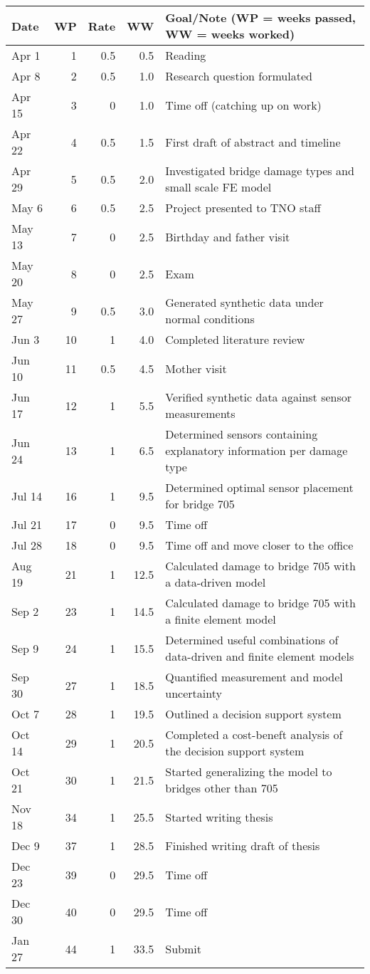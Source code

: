 \documentclass[11pt]{article}
\begin{document}
\begin{center}
\begin{tabular}{lrrrl}
Date & WP & Rate & WW & Goal/Note (WP = weeks passed, WW = weeks worked)\\
\hline
Apr 1 & 1 & 0.5 & 0.5 & Reading\\
Apr 8 & 2 & 0.5 & 1.0 & Research question formulated\\
Apr 15 & 3 & 0 & 1.0 & \cellcolor{blue!25} Time off (catching up on work)\\
Apr 22 & 4 & 0.5 & 1.5 & First draft of abstract and timeline\\
Apr 29 & 5 & 0.5 & 2.0 & Investigated bridge damage types and small scale FE model\\
May 6 & 6 & 0.5 & 2.5 & Project presented to TNO staff\\
May 13 & 7 & 0 & 2.5 & \cellcolor{blue!25} Birthday and father visit\\
May 20 & 8 & 0 & 2.5 & \cellcolor{blue!25} Exam\\
May 27 & 9 & 0.5 & 3.0 & Generated synthetic data under normal conditions\\
Jun 3 & 10 & 1 & 4.0 & Completed literature review\\
Jun 10 & 11 & 0.5 & 4.5 & \cellcolor{blue!25} Mother visit\\
Jun 17 & 12 & 1 & 5.5 & Verified synthetic data against sensor measurements\\
Jun 24 & 13 & 1 & 6.5 & Determined sensors containing explanatory information per damage type\\
Jul 14 & 16 & 1 & 9.5 & Determined optimal sensor placement for bridge 705\\
Jul 21 & 17 & 0 & 9.5 & \cellcolor{blue!25} Time off\\
Jul 28 & 18 & 0 & 9.5 & \cellcolor{blue!25} Time off and move closer to the office\\
Aug 19 & 21 & 1 & 12.5 & Calculated damage to bridge 705 with a data-driven model\\
Sep 2 & 23 & 1 & 14.5 & Calculated damage to bridge 705 with a finite element model\\
Sep 9 & 24 & 1 & 15.5 & Determined useful combinations of data-driven and finite element models\\
Sep 30 & 27 & 1 & 18.5 & Quantified measurement and model uncertainty\\
Oct 7 & 28 & 1 & 19.5 & Outlined a decision support system\\
Oct 14 & 29 & 1 & 20.5 & Completed a cost-beneft analysis of the decision support system\\
Oct 21 & 30 & 1 & 21.5 & Started generalizing the model to bridges other than 705\\
Nov 18 & 34 & 1 & 25.5 & Started writing thesis\\
Dec 9 & 37 & 1 & 28.5 & Finished writing draft of thesis\\
Dec 23 & 39 & 0 & 29.5 & \cellcolor{blue!25} Time off\\
Dec 30 & 40 & 0 & 29.5 & \cellcolor{blue!25} Time off\\
Jan 27 & 44 & 1 & 33.5 & Submit\\
\end{tabular}
\end{center}
\end{document}
